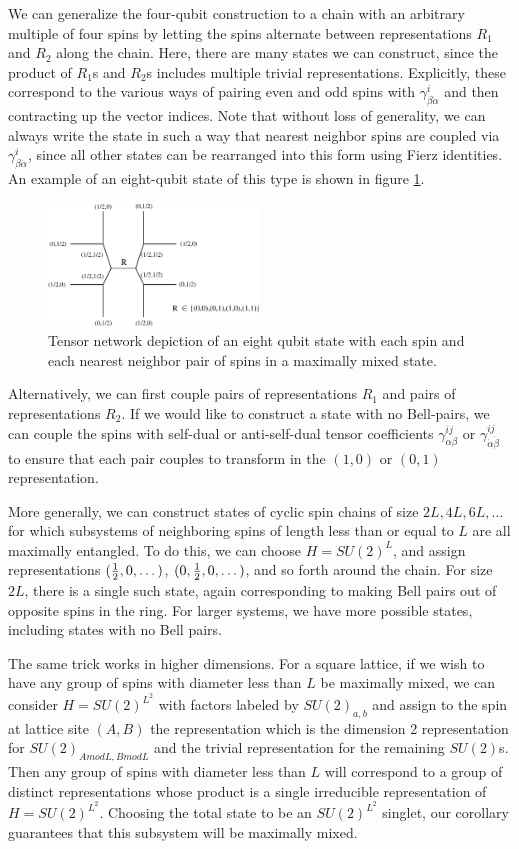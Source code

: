 \documentclass[12pt]{article}
\theoremstyle{definition}
\begin{document}
We can generalize the four-qubit construction to a chain with an arbitrary multiple of four spins by letting the spins alternate between representations $R_1$ and $R_2$ along the chain. Here, there are many states we can construct, since the product of $R_1$s and $R_2$s includes multiple trivial representations. Explicitly, these correspond to the various ways of pairing even and odd spins with $\gamma^i_{\beta \dot{\alpha}}$ and then contracting up the vector indices. Note that without loss of generality, we can always write the state in such a way that nearest neighbor spins are coupled via $\gamma^i_{\beta \dot{\alpha}}$, since all other states can be rearranged into this form using Fierz identities. An example of an eight-qubit state of this type is shown in figure \ref{group2}.
\begin{figure}
\centering
\includegraphics[width=0.5\textwidth]{group2.eps}
\caption{Tensor network depiction of an eight qubit state with each spin and each nearest neighbor pair of spins in a maximally mixed state. }
\label{group2}
\end{figure}
Alternatively, we can first couple pairs of representations $R_1$ and pairs of representations $R_2$. If we would like to construct a state with no Bell-pairs, we can couple the spins with self-dual or anti-self-dual tensor coefficients $\gamma^{ij}_{\alpha \beta}$ or $\gamma^{ij}_{\dot{\alpha} \dot{\beta}}$ to ensure that each pair couples to transform in the $(1,0)$ or $(0,1)$ representation.

More generally, we can construct states of cyclic spin chains of size $2L,4L,6L,\dots$ for which subsystems of neighboring spins of length less than or equal to $L$ are all maximally entangled. To do this, we can choose $H = SU(2)^L$, and assign representations $({1 \over 2}, 0,\dots)$, $(0,{1 \over 2}, 0,\dots)$, and so forth around the chain. For size $2L$, there is a single such state, again corresponding to making Bell pairs out of opposite spins in the ring. For larger systems, we have more possible states, including states with no Bell pairs.

The same trick works in higher dimensions. For a square lattice, if we wish to have any group of spins with diameter less than $L$ be maximally mixed, we can consider $H = SU(2)^{L^2}$ with factors labeled by $SU(2)_{a,b}$ and assign to the spin at lattice site $(A,B)$ the representation which is the dimension 2 representation for $SU(2)_{A mod L, B mod L}$ and the trivial representation for the remaining $SU(2)$s. Then any group of spins with diameter less than $L$ will correspond to a group of distinct representations whose product is a single irreducible representation of $H = SU(2)^{L^2}$. Choosing the total state to be an $SU(2)^{L^2}$ singlet, our corollary guarantees that this subsystem will be maximally mixed.
\end{document}

